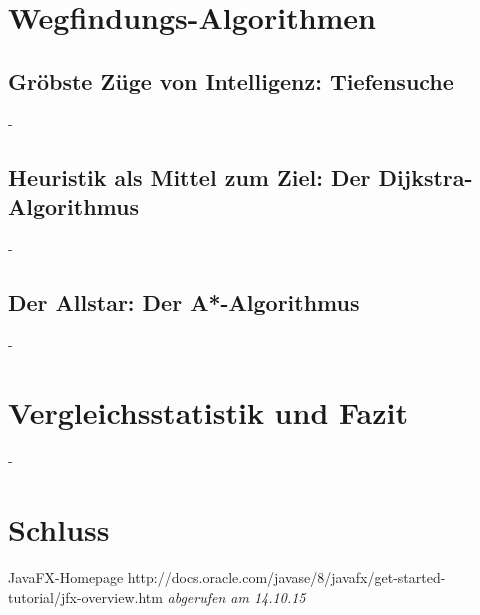 \documentclass[12pt]{article}
\begin{document}
\section{Wegfindungs-Algorithmen}
\newpage

\subsection{Gröbste Züge von Intelligenz: Tiefensuche}
\newpage
-
\newpage

\subsection{Heuristik als Mittel zum Ziel: Der Dijkstra-Algorithmus}
\newpage
-
\newpage

\subsection{Der Allstar: Der A*-Algorithmus}
\newpage
-
\newpage

\section{Vergleichsstatistik und Fazit}
\newpage
-
\newpage

\section{Schluss}
\newpage

\begin{thebibliography}{9}
 JavaFX-Homepage http://docs.oracle.com/javase/8/javafx/get-started-tutorial/jfx-overview.htm \emph{abgerufen am 14.10.15}
\end{thebibliography}
\end{document}
